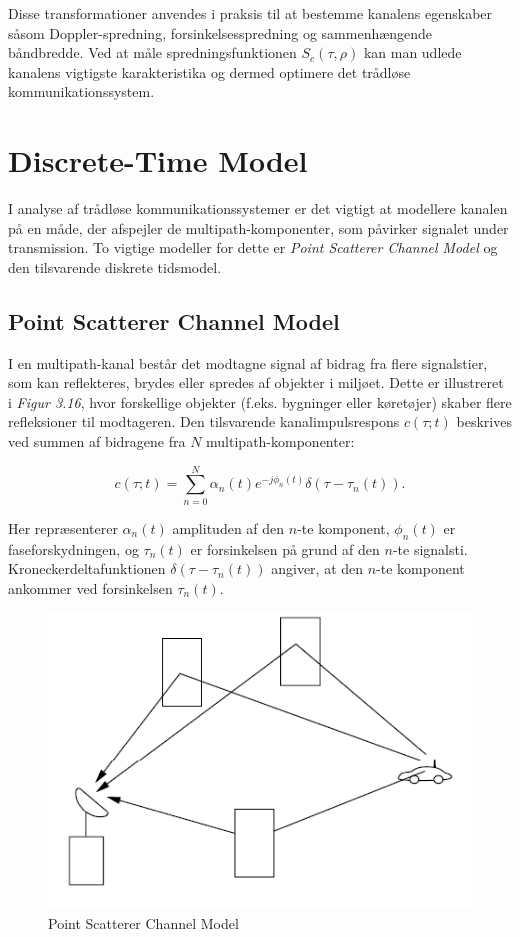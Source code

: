 \documentclass[a4paper,12pt]{book}
\begin{document}
	Disse transformationer anvendes i praksis til at bestemme kanalens egenskaber såsom Doppler-spredning, forsinkelsesspredning og sammenhængende båndbredde. Ved at måle spredningsfunktionen \( S_c(\tau, \rho) \) kan man udlede kanalens vigtigste karakteristika og dermed optimere det trådløse kommunikationssystem.
	
	\section{Discrete-Time Model}	
	I analyse af trådløse kommunikationssystemer er det vigtigt at modellere kanalen på en måde, der afspejler de multipath-komponenter, som påvirker signalet under transmission. To vigtige modeller for dette er \textit{Point Scatterer Channel Model} og den tilsvarende diskrete tidsmodel.
	
	\subsection{Point Scatterer Channel Model}
	I en multipath-kanal består det modtagne signal af bidrag fra flere signalstier, som kan reflekteres, brydes eller spredes af objekter i miljøet. Dette er illustreret i \textit{Figur 3.16}, hvor forskellige objekter (f.eks. bygninger eller køretøjer) skaber flere refleksioner til modtageren. Den tilsvarende kanalimpulsrespons \(c(\tau; t)\) beskrives ved summen af bidragene fra \(N\) multipath-komponenter:
	
	\[
	c(\tau; t) = \sum_{n=0}^{N} \alpha_n(t) e^{-j \phi_n(t)} \delta(\tau - \tau_n(t)).
	\]
	
	Her repræsenterer \( \alpha_n(t) \) amplituden af den \(n\)-te komponent, \( \phi_n(t) \) er faseforskydningen, og \( \tau_n(t) \) er forsinkelsen på grund af den \(n\)-te signalsti. Kroneckerdeltafunktionen \( \delta(\tau - \tau_n(t)) \) angiver, at den \(n\)-te komponent ankommer ved forsinkelsen \( \tau_n(t) \).
	
	\begin{figure}[!h]
		\centering\includegraphics[width=\textwidth]{fig/fig30.png}
		\caption{Point Scatterer Channel Model}
	\end{figure}
	
\end{document}
